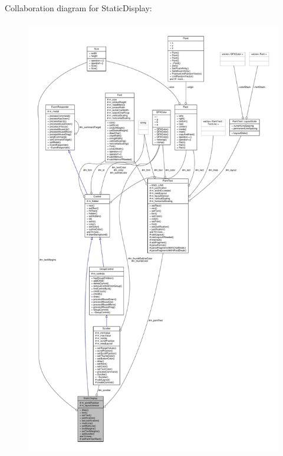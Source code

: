 Collaboration diagram for Static\+Display\+:
\nopagebreak
\begin{figure}[H]
\begin{center}
\leavevmode
\includegraphics[height=550pt]{d7/df2/classStaticDisplay__coll__graph}
\end{center}
\end{figure}
